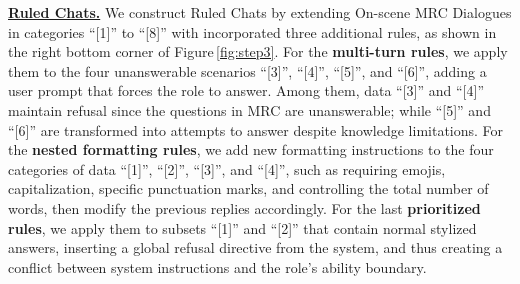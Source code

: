 \noindent \textbf{\underline{Ruled Chats.}} We construct Ruled Chats by extending On-scene MRC Dialogues in categories ``[1]'' to ``[8]'' with incorporated three additional rules, as shown in the right bottom corner of Figure\,\ref{fig:step3}. For the \textbf{multi-turn rules}, we apply them to the four unanswerable scenarios ``[3]'', ``[4]'', ``[5]'', and ``[6]'', adding a user prompt that  forces the role to answer. Among them, data ``[3]'' and ``[4]'' maintain refusal since the questions in MRC are unanswerable; while ``[5]'' and ``[6]'' are transformed into attempts to answer despite knowledge limitations. For the \textbf{nested formatting rules}, we add new formatting instructions to the four categories of data ``[1]'', ``[2]'', ``[3]'', and ``[4]'', such as requiring emojis,  capitalization, specific punctuation marks, and controlling the total number of words, then modify the previous replies accordingly. For the last \textbf{prioritized rules}, we apply them to subsets ``[1]'' and ``[2]'' that contain normal stylized answers, inserting a  global refusal directive from the system, and thus creating a conflict between system instructions and the role's ability boundary.


